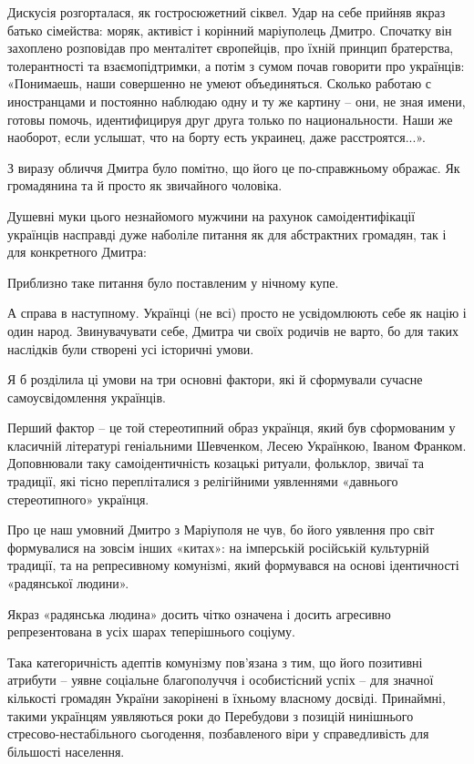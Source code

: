 Дискусія розгорталася, як гостросюжетний сіквел. Удар на себе прийняв якраз
батько сімейства: моряк, активіст і корінний маріуполець  Дмитро. Спочатку він
захоплено розповідав про менталітет європейців, про їхній принцип братерства,
толерантності та взаємопідтримки, а потім з сумом почав говорити про українців:
«Понимаешь, наши совершенно не умеют объединяться. Сколько работаю с
иностранцами и постоянно наблюдаю одну и ту же картину – они, не зная имени,
готовы помочь, идентифицируя друг друга только по национальности. Наши же
наоборот, если услышат, что на борту есть украинец, даже расстроятся...».

З виразу обличчя Дмитра було помітно, що його це по-справжньому ображає. Як
громадянина та й просто як звичайного чоловіка.

Душевні муки цього незнайомого мужчини на рахунок самоідентифікації українців
насправді дуже наболіле питання як для абстрактних громадян, так і для
конкретного Дмитра:


Приблизно таке питання було поставленим у нічному купе.

А справа в наступному. Українці (не всі) просто не усвідомлюють себе як націю і
один народ. Звинувачувати себе, Дмитра чи своїх родичів не варто, бо для таких
наслідків були створені усі історичні умови.

Я б розділила ці умови на три основні фактори, які й сформували сучасне
самоусвідомлення  українців.

Перший фактор – це той стереотипний образ українця,  який був сформованим у
класичній літературі геніальними Шевченком, Лесею Українкою, Іваном Франком.
Доповнювали таку самоідентичність козацькі ритуали, фольклор, звичаї та
традиції, які тісно перепліталися з релігійними уявленнями «давнього
стереотипного» українця.

Про це наш умовний Дмитро з Маріуполя не чув, бо його уявлення про світ
формувалися на зовсім інших «китах»: на імперській російській культурній
традиції, та на репресивному комунізмі, який формувався на основі ідентичності
«радянської людини».

Якраз «радянська людина» досить чітко означена і досить агресивно
репрезентована в усіх шарах теперішнього соціуму.

Така категоричність адептів комунізму пов’язана з тим, що його позитивні
атрибути – уявне соціальне благополуччя і особистісний успіх – для значної
кількості громадян України закорінені в їхньому власному досвіді.  Принаймні,
такими українцям уявляються роки до Перебудови з позицій нинішнього
стресово-нестабільного сьогодення, позбавленого віри у справедливість для
більшості населення.

